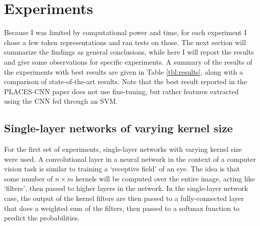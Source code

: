 \documentclass[10pt]{article}
\begin{document}
\section{Experiments}

Because I was limited by computational power and time, for each experiment I chose a few token representations and ran tests on those. The next section will summarize the findings as general conclusions, while here I will report the results and give some observations for specific experiments. A summary of the results of the experiments with best results are given in Table \ref{tbl:results}, along with a comparison of state-of-the-art results. Note that the best result reported in the PLACES-CNN paper \cite{zhou_learning_2014} does not use fine-tuning, but rather features extracted using the CNN fed through an SVM.

\begin{table}[!ht]
\centering
{}
\caption{Summary of top-1 and top-5 accuracy results on the test set}
\label{tbl:results}
\end{table}

\subsection{Single-layer networks of varying kernel size}

For the first set of experiments, single-layer networks with varying kernel size were used. A convolutional layer in a neural network in the context of a computer vision task is similar to training a `receptive field' of an eye. The idea is that some number of $n \times m$ kernels will be computed over the entire image, acting like `filters', then passed to higher layers in the network. In the single-layer network case, the output of the kernel filters are then passed to a fully-connected layer that does a weighted sum of the filters, then passed to a softmax function to predict the probabilities. 
\end{document}
